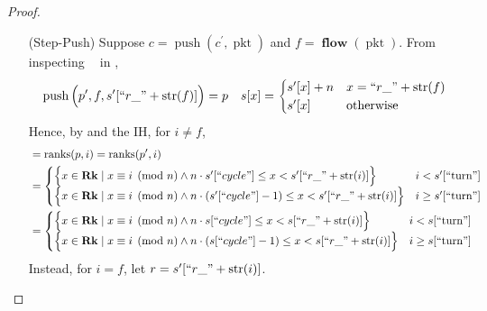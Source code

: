 \documentclass{amsart}
\DeclareMathOperator{\pkt}{\mathrm{pkt}}
\DeclareMathOperator{\push}{\mathrm{push}}
\DeclareMathOperator{\Rk}{\mathbf{Rk}}
\DeclareMathOperator{\flow}{\mathbf{flow}}
\DeclareMathOperator{\zprepush}{z_{\mathrm{pre-push}}}
\DeclareMathOperator{\ranks}{\mathrm{ranks}}
\theoremstyle{definition}
\begin{document}
\begin{proof}
\begin{enumerate}
\begin{enumerate}
                \item[(Step-Push)] Suppose $c = \push(c^\prime, \pkt)$ and $f = \flow(\pkt)$.
                    From inspecting $\zprepush$ in ,
                    \begin{align*}
                        \push\Big(p^\prime, f, s^\prime[``r\_" + \mathrm{str}(f)]\Big) = p
                        &&
                        s[x] =
                        \begin{cases}
                            s^\prime[x] + n & x = ``r\_" + \mathrm{str}(f)\\
                            s^\prime[x] & \text{otherwise}
                        \end{cases}
                    \end{align*}
                    Hence, by  and the IH, for $i \neq f$,
                    \begin{align*}
                        &= \ranks(p, i) = \ranks(p^\prime, i)\\
                        &=
                            \begin{cases}
                                \Big\{x \in \Rk \mid x \equiv i \pmod n \land n \cdot s^\prime[``cycle"] \leq x < s^\prime[``r\_" + \mathrm{str}(i)] \Big\} 
                                & i < s^\prime[``\text{turn}"]\\
                                \Big\{x \in \Rk \mid x \equiv i \pmod n \land n \cdot (s^\prime[``cycle"] - 1) \leq x < s^\prime[``r\_" + \mathrm{str}(i)]\Big\} 
                                & i \geq s^\prime[``\text{turn}"]
                            \end{cases}\\
                        &=
                            \begin{cases}
                                \Big\{x \in \Rk \mid x \equiv i \pmod n \land n \cdot s[``cycle"] \leq x < s[``r\_" + \mathrm{str}(i)] \Big\} 
                                & i < s[``\text{turn}"]\\
                                \Big\{x \in \Rk \mid x \equiv i \pmod n \land n \cdot (s[``cycle"] - 1) \leq x < s[``r\_" + \mathrm{str}(i)]\Big\} 
                                & i \geq s[``\text{turn}"]
                            \end{cases}
                    \end{align*}
                    Instead, for $i = f$, let $r = s^\prime[``r\_" + \mathrm{str}(i)]$. 

\end{enumerate}
\end{enumerate}
\end{proof}
\end{document}
